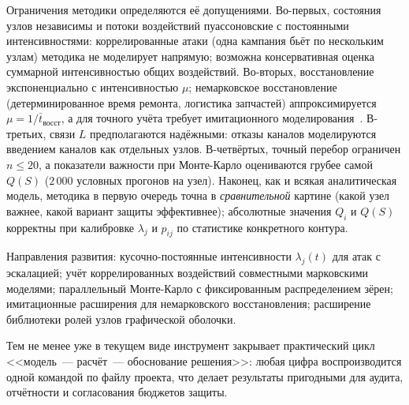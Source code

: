 \documentclass[12pt]{article}
\begin{document}
Ограничения методики определяются её допущениями. Во-первых, состояния
узлов независимы и потоки воздействий пуассоновские с постоянными
интенсивностями: коррелированные атаки (одна кампания бьёт по нескольким
узлам) методика не моделирует напрямую; возможна консервативная оценка
суммарной интенсивностью общих воздействий. Во-вторых, восстановление
экспоненциально с интенсивностью $\mu$; немарковское восстановление
(детерминированное время ремонта, логистика запчастей) аппроксимируется
$\mu = 1 / \bar t_{\text{восст}}$, а для точного учёта требует
имитационного моделирования~\cite{ross}. В-третьих, связи $L$
предполагаются надёжными: отказы каналов моделируются введением каналов
как отдельных узлов. В-четвёртых, точный перебор ограничен $n \leq 20$,
а показатели важности при Монте-Карло оцениваются грубее самой $Q(S)$
($2\,000$ условных прогонов на узел). Наконец, как и всякая аналитическая
модель, методика в первую очередь точна в \emph{сравнительной} картине
(какой узел важнее, какой вариант защиты эффективнее); абсолютные
значения $Q_i$ и $Q(S)$ корректны при калибровке $\lambda_j$ и $p_{ij}$
по статистике конкретного контура.

Направления развития: кусочно-постоянные интенсивности $\lambda_j(t)$
для атак с эскалацией; учёт коррелированных воздействий совместными
марковскими моделями; параллельный Монте-Карло с фиксированным
распределением зёрен; имитационные расширения для немарковского
восстановления; расширение библиотеки ролей узлов графической оболочки.

Тем не менее уже в текущем виде инструмент закрывает практический цикл
<<модель~--- расчёт~--- обоснование решения>>: любая цифра воспроизводится
одной командой по файлу проекта, что делает результаты пригодными для
аудита, отчётности и согласования бюджетов защиты.
\end{document}
